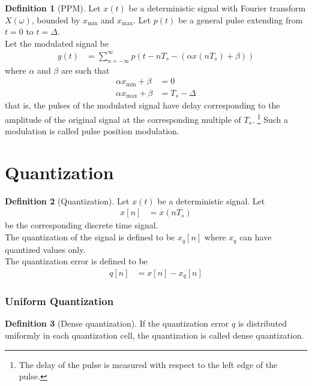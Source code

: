 \documentclass[titlepage, fleqn, a4paper, 12pt, twoside]{article}
\theoremstyle{definition}
\newtheorem{definition}{Definition}
\theoremstyle{theorem}
\begin{document}
\begin{definition}[PPM]
	Let $x(t)$ be a deterministic signal with Fourier transform $X(\omega)$, bounded by $x_{\text{min}}$ and $x_{\text{max}}$.
	Let $p(t)$ be a general pulse extending from $t = 0$ to $t = \Delta$.\\
	Let the modulated signal be
	\begin{align*}
		y(t) &= \sum\limits_{n = -\infty}^{\infty} p\left( t - n T_s - \left( \alpha x(n T_s) + \beta \right) \right)
	\end{align*}
	where $\alpha$ and $\beta$ are such that
	\begin{align*}
		\alpha x_{\text{min}} + \beta &= 0\\
		\alpha x_{\text{max}} + \beta &= T_s - \Delta
	\end{align*}
	that is, the pulses of the modulated signal have delay corresponding to the amplitude of the original signal at the corresponding multiple of $T_s$.
	\footnote{The delay of the pulse is measured with respect to the left edge of the pulse.}
	Such a modulation is called pulse position modulation.
	\label{def:PPM}
\end{definition}

\clearpage
\part{Quantization}

\begin{definition}[Quantization]
	Let $x(t)$ be a deterministic signal.
	Let
	\begin{align*}
		x[n] &= x(n T_s)
	\end{align*}
	be the corresponding discrete time signal.\\
	The quantization of the signal is defined to be $x_q[n]$ where $x_q$ can have quantized values only.\\
	The quantization error is defined to be
	\begin{align*}
		q[n] &= x[n] - x_q[n]
	\end{align*}
\end{definition}

\section{Uniform Quantization}

\begin{definition}[Dense quantization]
	If the quantization error $q$ is distributed uniformly in each quantization cell, the quantization is called dense quantization.
\end{definition}
\end{document}
